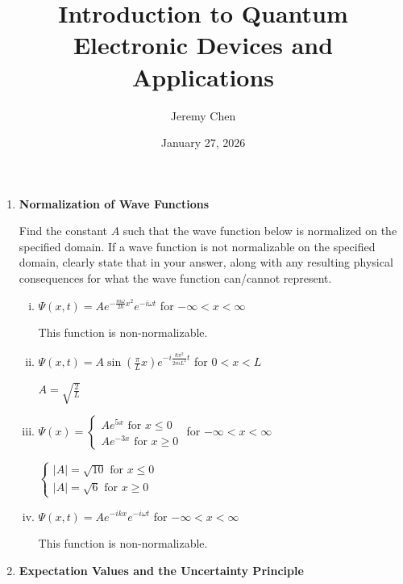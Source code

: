\documentclass[10pt,letterpaper]{article}
\title{Introduction to Quantum Electronic Devices and Applications}
\author{Jeremy Chen}
\date{January 27, 2026}
\begin{document}
	\maketitle

\begin{enumerate}

\item \textbf{Normalization of Wave Functions}

\noindent Find the constant $A$ such that the wave function below is normalized on the specified domain. If a
wave function is not normalizable on the specified domain, clearly state that in your answer, along
with any resulting physical consequences for what the wave function can/cannot represent.

\begin{enumerate}[i)]

\item $\Psi(x, t) = Ae^{-\frac{m\omega}{2\hbar}x^{2}}e^{-i\omega t}$ for $-\infty < x < \infty$

\color{violet}
This function is non-normalizable.
\color{black}

\item $\Psi(x, t) = A\sin\left( \frac{\pi}{L}x \right)e^{-i\frac{\hbar\pi^{2}}{2mL^{2}}t}$ for $0 < x < L$

\color{violet}
$A = \sqrt{\frac{2}{L}}$
\color{black}

\item $\Psi(x) = \begin{cases}
Ae^{5x} \text{ for } x \leq 0 \\
Ae^{-3x} \text{ for } x \geq 0 
\end{cases}$ for $-\infty < x < \infty$

\color{violet}
$\begin{cases}
|A| = \sqrt{10} \text{ for } x \leq 0 \\
|A| = \sqrt{6} \text{ for } x \geq 0 
\end{cases}$
\color{black}

\item $\Psi(x, t) = Ae^{-ikx}e^{-i\omega t}$ for $-\infty < x < \infty$

\color{violet}
This function is non-normalizable.
\color{black}

\end{enumerate}

\item \textbf{Expectation Values and the Uncertainty Principle}


\end{enumerate}
\end{document}
